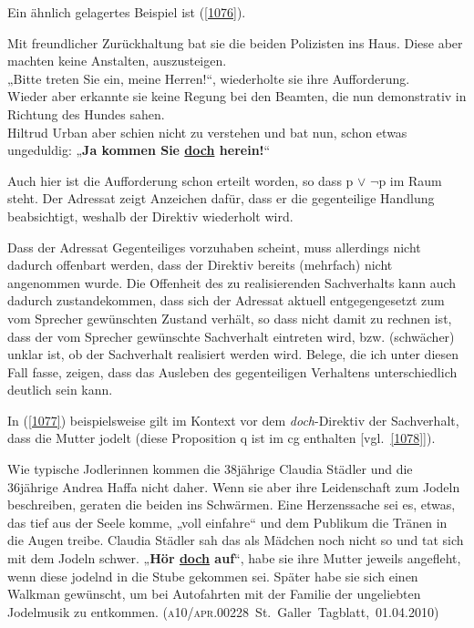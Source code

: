 Ein ähnlich gelagertes Beispiel ist (\ref{1076}).

\begin{exe}
	\ex\label{1076} 

	Mit freundlicher Zurückhaltung bat sie die beiden Polizisten ins Haus. Diese aber machten keine Anstalten, auszusteigen.\\
	„Bitte treten Sie ein, meine Herren!“, wiederholte sie ihre Aufforderung.\\
	Wieder aber erkannte sie keine Regung bei den Beamten, die nun demonstrativ in Richtung des Hundes sahen.\\
	Hiltrud Urban aber schien nicht zu verstehen und bat nun, schon etwas ungeduldig: „\textbf{Ja kommen Sie \ul{doch} herein!}“ 		
	\hfill\hbox{\citet[221]{Kluepfel2012}}
\end{exe}
Auch hier ist die Aufforderung schon erteilt worden, so dass p $\vee$ $\neg$p im Raum steht. Der Adressat zeigt Anzeichen dafür, dass er die gegenteilige Handlung beabsichtigt, weshalb der Direktiv wiederholt wird.

Dass der Adressat Gegenteiliges vorzuhaben scheint, muss allerdings nicht dadurch offenbart werden, dass der Direktiv bereits (mehrfach) nicht angenommen wurde. Die Offenheit des zu realisierenden Sachverhalts kann auch dadurch zustandekommen, dass sich der Adressat aktuell entgegengesetzt zum vom Spre\-cher gewünschten Zustand verhält, so dass nicht damit zu rechnen ist, dass der vom Sprecher gewünschte Sachverhalt eintreten wird, bzw. (schwächer) unklar ist, ob der Sachverhalt realisiert werden wird. Belege, die ich unter diesen Fall fasse, zeigen, dass das Ausleben des gegenteiligen Verhaltens unterschiedlich deutlich sein kann.

In (\ref{1077}) beispielsweise gilt im Kontext vor dem \textit{doch}-Direktiv der Sachverhalt, dass die Mutter jodelt (diese Proposition q ist im cg enthalten [vgl.\ \ref{1078}]).
		
\begin{exe}
	\ex\label{1077} 

	Wie typische Jodlerinnen kommen die 38jährige Claudia Städler und die 36jährige Andrea Haffa nicht daher. Wenn sie aber ihre Leidenschaft zum Jodeln 		beschreiben, geraten die beiden ins Schwärmen. Eine Herzenssache sei es, etwas, das tief aus der Seele komme, „voll einfahre“ und dem 			Publikum die Tränen in die Augen treibe. Claudia Städler sah das als Mädchen noch nicht so und tat sich mit dem Jodeln schwer. „\textbf{Hör \ul{doch} auf}“, habe sie ihre Mutter jeweils angefleht, wenn diese jodelnd in die Stube gekommen sei. Später habe sie sich einen Walkman gewünscht, um bei 		Autofahrten mit der Familie der ungeliebten Jodelmusik zu entkommen.		
	\newline\hbox{}\hfill\hbox{(\textsc{a10/apr.00228} St. Galler Tagblatt, 01.04.2010)}
\end{exe}		
 	    
